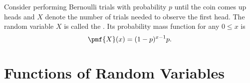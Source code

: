 \begin{cluster}
\label{grp:grm:probability::randvar::geometric-random-variable}

\begin{gram}
\label{grm:probability::randvar::geometric-random-variable}
Consider performing Bernoulli trials with probability $p$ until the
coin comes up heads and  $X$ denote the number of trials needed to
observe the first head. 
The random variable $X$ is called the .
Its probability mass function for any $0 \le x$ is 
\[
\pmf{X}(x) = (1-p)^{x-1} p.
\]

\end{gram}
\end{cluster}


\section{Functions of Random Variables}
\label{sec:probability::randvar::functionsof}

